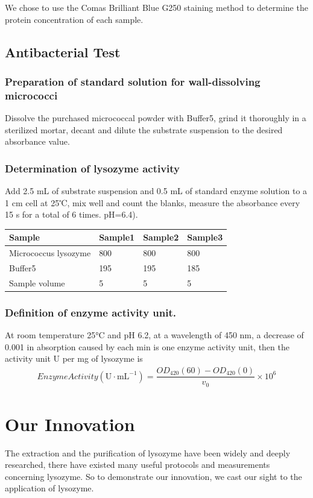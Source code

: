 We chose to use the Comas Brilliant Blue G250 staining method to
determine the protein concentration of each sample.

\hypertarget{antibacterial-test}{%
	\subsection{Antibacterial Test}\label{antibacterial-test}}

\subsubsection{Preparation of standard solution for wall-dissolving
	micrococci }

Dissolve the purchased micrococcal powder with Buffer5, grind it
thoroughly in a sterilized mortar, decant and dilute the substrate
suspension to the desired absorbance value.

\subsubsection{Determination of lysozyme activity}

Add 2.5 mL of substrate suspension and 0.5 mL of standard enzyme
solution to a 1 cm cell at 25℃, mix well and count the blanks, measure
the absorbance every 15 s for a total of 6 times. pH=6.4).

\begin{longtable}[]{@{}llll@{}}
	\toprule
	Sample & Sample1 & Sample2 & Sample3\tabularnewline
	\midrule
	\endhead
	Micrococcus lysozyme & 800 & 800 & 800\tabularnewline
	Buffer5 & 195 & 195 & 185\tabularnewline
	Sample volume & 5 & 5 & 5\tabularnewline
	\bottomrule
\end{longtable}

\subsubsection{Definition of enzyme activity unit.}

At room temperature 25°C and pH 6.2, at a wavelength of 450 nm, a
decrease of 0.001 in absorption caused by each min is one enzyme
activity unit, then the activity unit U per mg of lysozyme is
\begin{gather*}
	Enzyme Activity(\mathrm{U\cdot mL^{-1}})=\dfrac{OD_{420}(60)-OD_{420}(0)}{v_0}\times 10^{6}
\end{gather*}


\section{Our Innovation}
The extraction and the purification of lysozyme have been widely and deeply researched, there have existed many useful protocols and measurements concerning lysozyme. So to demonstrate our innovation, we cast our sight to the application of lysozyme. 

